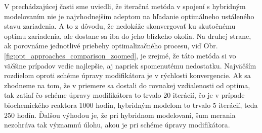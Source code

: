 V prechádzajúcej časti sme uviedli, že iteračná metóda v spojení s hybridným modelovaním nie je najvhodnejším adeptom na hľadanie optimálneho ustáleného stavu zariadenia. A to z dôvodu, že nedokáže skonvergovať ku skutočnému optimu zariadenia, ale dostane sa iba do jeho blízkeho okolia. Na druhej strane, ak porovnáme jednotlivé priebehy optimalizačného procesu, viď Obr. \ref{fig:opt_approaches_comparison_zoomed}, je zrejmé, že táto metóda si vo väčšine prípadov vedie najlepšie, aj napriek spomenutému nedostatku. Najväčším rozdielom oproti schéme úpravy modifikátora je v rýchlosti konvergencie. Ak sa zhodneme na tom, že v priemere sa dostali do rovnakej vzdialenosti od optima, tak zatiaľ čo schéme úpravy modifikátora to trvalo 20 iterácií, čo je v prípade biochemického reaktora 1000 hodín, hybridným modelom to trvalo 5 iterácií, teda 250 hodín. Ďalšou výhodou je, že pri hybridnom modelovaní, šum merania nezohráva tak významnú úlohu, akou je pri schéme úpravy modifikátora. 
